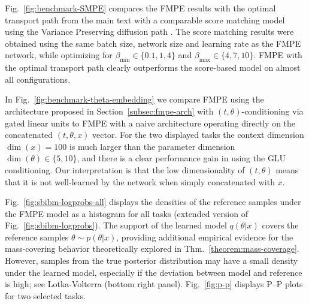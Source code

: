 \documentclass{article}
\theoremstyle{remark}
\begin{document}
Fig.~\ref{fig:benchmark-SMPE} compares the FMPE results with the optimal transport path from the main text with a comparable score matching model using the Variance Preserving diffusion path \cite{song2020score}. The score matching results were obtained using the same batch size, network size and learning rate as the FMPE network, while optimizing for $\beta_{\text{min}}\in \{0.1, 1, 4\}$ and $\beta_{\text{max}}\in \{ 4, 7, 10\}$. FMPE with the optimal transport path clearly outperforms the score-based model on almost all configurations. 

In Fig.~\ref{fig:benchmark-theta-embedding} we compare FMPE using the architecture proposed in Section~\ref{subsec:fmpe-arch} with $(t,\theta)$-conditioning via gated linear units to FMPE with a naive architecture operating directly on the concatenated $(t,\theta,x)$ vector. For the two displayed tasks the context dimension  $\dim(x) = 100$ is much larger than the parameter dimension $\dim(\theta) \in \{5, 10 \}$, and there is a clear performance gain in using the GLU conditioning. Our interpretation is that the low dimensionality of $(t, \theta)$ means that it is not well-learned by the network when simply concatenated with $x$.

Fig.~\ref{fig:sbibm-logprobs-all} displays the densities of the reference samples under the FMPE model as a histogram for all tasks (extended version of Fig.~\ref{fig:sbibm-logprobs}). The support of the learned model $q(\theta |x)$ covers the reference samples $\theta \sim p(\theta | x)$, providing additional empirical evidence for the mass-covering behavior theoretically explored in Thm.~\ref{theorem:mass-coverage}. However, samples from the true posterior distribution may have a small density under the learned model, especially if the deviation between model and reference is high; see Lotka-Volterra (bottom right panel). Fig.~\ref{fig:p-p} displays P--P plots for two selected tasks.
\end{document}

